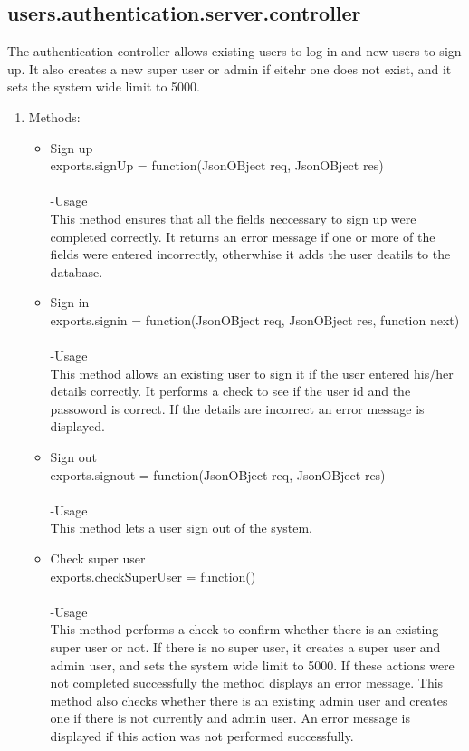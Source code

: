 \documentclass[a4paper,12pt]{article}
\begin{document}
\subsection{users.authentication.server.controller}
 The authentication controller allows existing users to log in and new users to sign up. It also creates a new super user or admin if eitehr one does not exist, and it sets the system wide limit to 5000.
\begin{enumerate}
\item Methods:
	\begin{itemize}
	\item Sign up\\ 
  	exports.signUp = function(JsonOBject req, JsonOBject res)\\ \\
  	-Usage\\
  	This method ensures that all the fields neccessary to sign up were completed correctly. It returns an error message if one or 	more of the fields were entered incorrectly, otherwhise it adds the user deatils to the database.
 	 \item Sign in\\
	exports.signin = function(JsonOBject req, JsonOBject res, function next) \\ \\
	-Usage\\
	This method allows an existing user to sign it if the user entered his/her details correctly. It performs a check to see if the user 	id and the passoword is correct. If the details are incorrect an error message is displayed.
	\item Sign out\\
	exports.signout = function(JsonOBject req, JsonOBject res)\\  \\
	-Usage\\
	This method lets a user sign out of the system.
 	 \item Check super user\\ exports.checkSuperUser = function()\\ \\
 	 -Usage\\ 
  This method performs a check to confirm whether there is an existing super user or not. If there is no super user, it creates a super user and admin user, and sets the system wide limit to 5000. If these actions were not completed successfully the method displays an error message. This method also checks whether there is an existing admin user and creates one if there is not currently and admin user. An error message is displayed if this action was not performed successfully.
	\end{itemize}
\end{enumerate} 
\end{document}
